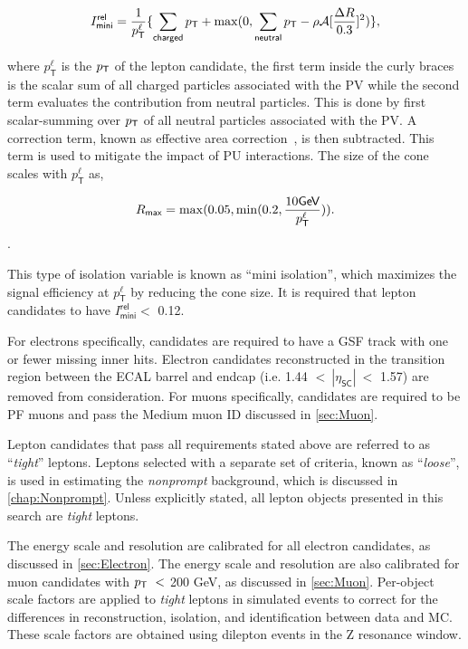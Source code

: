 \begin{equation}
\label{eq:mini}
I^{\textsf{rel}}_{\textsf{mini}} = \frac{1}{p_{\textsf{T}}^{\ell}} \{\sum_{\textsf{charged}}p_{\textsf{T}}+\max(0,\sum_{\textsf{neutral}}p_{\textsf{T}}-\rho \mathcal{A}[\frac{\mathrm{\Delta}R}{0.3}]^2)\},
\end{equation}

where $p_{\textsf{T}}^{\ell}$ is the $p_{\textsf{T}}$ of the lepton candidate, the first term inside the curly braces is the scalar sum of all charged particles associated with the \ac{PV} while the second term evaluates the contribution from neutral particles. This is done by first scalar-summing over $p_{\textsf{T}}$ of all neutral particles associated with the \ac{PV}. A correction term, known as effective area correction~\cite{Cacciari:2007fd}, is then subtracted. This term is used to mitigate the impact of \ac{PU} interactions. The size of the cone scales with $p_{\textsf{T}}^{\ell}$ as,  

\begin{equation}
R_{\textsf{max}} = \max (0.05, \min(0.2, \frac{10\textsf{GeV}}{p_{\textsf{T}}^{\ell}})).
\end{equation}.

This type of isolation variable is known as ``mini isolation'', which maximizes the signal efficiency at $p_{\textsf{T}}^{\ell}$ by reducing the cone size. It is required that lepton candidates to have $I^{\textsf{rel}}_{\textsf{mini}}<$ 0.12.

For electrons specifically, candidates are required to have a \ac{GSF} track with one or fewer missing inner hits. Electron candidates reconstructed in the transition region between the \ac{ECAL} barrel and endcap (i.e. 1.44 $<~|\eta_{\textsf{SC}}|~<$ 1.57) are removed from consideration. For muons specifically, candidates are required to be \ac{PF} muons and pass the Medium muon ID discussed in \autoref{sec:Muon}.

Lepton candidates that pass all requirements stated above are referred to as ``\emph{tight}'' leptons. Leptons selected with a separate set of criteria, known as ``\emph{loose}'', is used in estimating the \emph{nonprompt} background, which is discussed in \autoref{chap:Nonprompt}. Unless explicitly stated, all lepton objects presented in this search are \emph{tight} leptons.

The energy scale and resolution are calibrated for all electron candidates, as discussed in \autoref{sec:Electron}. The energy scale and resolution are also calibrated for muon candidates with $p_{\textsf{T}}~<$ 200 GeV, as discussed in \autoref{sec:Muon}. Per-object scale factors are applied to \emph{tight} leptons in simulated events to correct for the differences in reconstruction, isolation, and identification between data and \ac{MC}. These scale factors are obtained using dilepton events in the Z resonance window.
